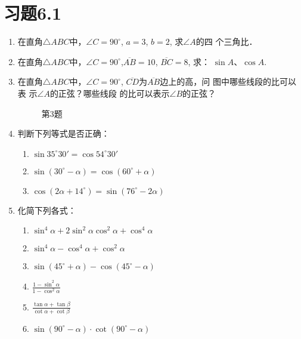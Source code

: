 \section*{习题6.1}
\begin{enumerate}
    \item 在直角$\triangle ABC$中，$\angle C=90^{\circ}$, $a=3$, $b=2$, 求$\angle A$的四
    个三角比．
    \item 在直角$\triangle ABC$中，$\angle C=90^{\circ}$,$\overline{AB}=10$, $\overline{BC}=8$, 求：
   $ \sin A$、$\cos A$.
    \item 在直角$\triangle ABC$中，$\angle C=90^{\circ}$, $\overline{CD}$为$\overline{AB}$边上的高，问
    图中哪些线段的比可以表
    示$\angle A$的正弦？哪些线段
    的比可以表示$\angle B$的正弦？
\begin{figure}[htp]
    \centering
    \caption*{第3题}
\end{figure}

    \item 判断下列等式是否正确：
\begin{enumerate}
\item $\sin35^{\circ} 30'=\cos54^{\circ} 30'$
\item $\sin(30^{\circ} -\alpha )=\cos(60^{\circ} +\alpha )$
\item $\cos(2\alpha +14^{\circ} )=\sin(76^{\circ} -2\alpha )$
\end{enumerate}

\item 化简下列各式：
\begin{enumerate}
\item $\sin^4\alpha  +2\sin^2\alpha \cos^2\alpha +\cos^4\alpha $
\item $\sin^4\alpha -\cos^4\alpha +\cos^2\alpha $
\item $\sin(45^{\circ} +\alpha )-\cos(45^{\circ} -\alpha )$    
\item $\frac{1-\sin^2\alpha }{1-\cos^2\alpha }$
\item $\frac{\tan \alpha +\tan \beta}{\cot\alpha +\cot \beta}$
\item $\sin(90^{\circ} -\alpha )\cdot \cot(90^{\circ} -\alpha )$
\end{enumerate}


\end{enumerate}
